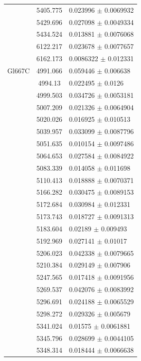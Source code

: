 \begin{longtable}{|c|c|l|}
 & 5405.775 & 0.023996 $\pm$ 0.0069932 \\       
 & 5429.696 & 0.027098 $\pm$ 0.0049334 \\       
 & 5434.524 & 0.013881 $\pm$ 0.0076068 \\       
 & 6122.217 & 0.023678 $\pm$ 0.0077657 \\       
 & 6162.173 & 0.0086322 $\pm$ 0.012331 \\       
\hline                                          
Gl667C & 4991.066 & 0.059446 $\pm$ 0.006638 \\  
 & 4994.13 & 0.022495 $\pm$ 0.0126 \\           
 & 4999.503 & 0.034726 $\pm$ 0.0053181 \\       
 & 5007.209 & 0.021326 $\pm$ 0.0064904 \\       
 & 5020.026 & 0.016925 $\pm$ 0.010513 \\        
 & 5039.957 & 0.033099 $\pm$ 0.0087796 \\       
 & 5051.635 & 0.010154 $\pm$ 0.0097486 \\       
 & 5064.653 & 0.027584 $\pm$ 0.0084922 \\       
 & 5083.339 & 0.014058 $\pm$ 0.011698 \\        
 & 5110.413 & 0.018888 $\pm$ 0.0070371 \\       
 & 5166.282 & 0.030475 $\pm$ 0.0089153 \\       
 & 5172.684 & 0.030984 $\pm$ 0.012331 \\        
 & 5173.743 & 0.018727 $\pm$ 0.0091313 \\       
 & 5183.604 & 0.02189 $\pm$ 0.009493 \\         
 & 5192.969 & 0.027141 $\pm$ 0.01017 \\         
 & 5206.023 & 0.042338 $\pm$ 0.0079665 \\       
 & 5210.384 & 0.029149 $\pm$ 0.007906 \\        
 & 5247.565 & 0.017418 $\pm$ 0.0091956 \\       
 & 5269.537 & 0.042076 $\pm$ 0.0083992 \\       
 & 5296.691 & 0.024188 $\pm$ 0.0065529 \\       
 & 5298.272 & 0.029326 $\pm$ 0.005679 \\        
 & 5341.024 & 0.01575 $\pm$ 0.0061881 \\        
 & 5345.796 & 0.028699 $\pm$ 0.0044105 \\       
 & 5348.314 & 0.018444 $\pm$ 0.0066638 \\       

\end{longtable}
